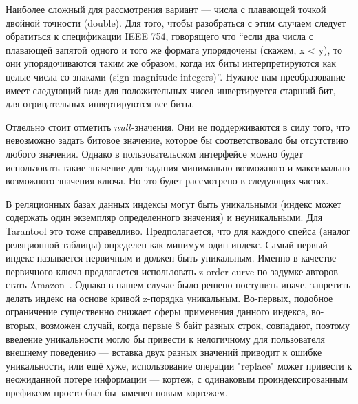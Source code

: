 Наиболее сложный для рассмотрения вариант --- числа с плавающей точкой двойной точности (double).
Для того, чтобы разобраться с этим случаем следует обратиться к спецификации IEEE 754,
говорящего что “если два числа с плавающей запятой одного и того же формата упорядочены (скажем, x < y),
то они упорядочиваются таким же образом, когда их биты интерпретируются как целые числа со знаками (sign-magnitude integers)”.
Нужное нам преобразование имеет следующий вид: для положительных чисел инвертируется старший бит, для отрицательных инвертируются все биты.

Отдельно стоит отметить $null$-значения. Они не поддерживаются в силу того, что невозможно задать битовое значение, которое бы соответствовало бы отсутствию любого значения.
Однако в пользовательском интерфейсе можно будет использовать такие значение для задания минимально возможного и максимально возможного значения ключа. Но это будет рассмотрено в следующих частях.

В реляционных базах данных индексы могут быть уникальными (индекс может содержать один экземпляр определенного значения) и неуникальными. Для Tarantool это тоже справедливо. Предполагается, что  для каждого спейса (аналог реляционной таблицы) определен как минимум один индекс.
Самый первый индекс называется первичным и должен быть уникальным.
Именно в качестве первичного ключа предлагается использовать z-order curve по задумке авторов стать Amazon~\cite{DynamoZorderP1, DynamoZorderP2}.
Однако в нашем случае было решено поступить иначе, запретить делать индекс на основе кривой z-порядка уникальным.
Во-первых, подобное ограничение существенно снижает сферы применения данного индекса,
во-вторых, возможен случай, когда первые 8 байт разных строк, совпадают,
поэтому введение уникальности могло бы привести к нелогичному для пользователя внешнему поведению ---
вставка двух разных значений приводит к ошибке уникальности, или ещё хуже, использование операции "replace"
может привести к неожиданной потере информации --- кортеж, с одинаковым проиндексированным префиксом
просто был бы заменен новым кортежем.

